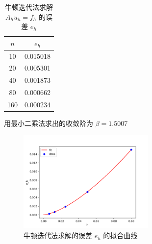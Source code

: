 \documentclass[a4paper,12pt]{ctexart}
\begin{document}
\begin{table}[ht!]
\centering
\caption{牛顿迭代法求解 $A_h u_h = f_h$ 的误差 $e_h$}
\begin{tabular}{|c|c|}
\hline
$n$     &   $e_h$  \\    \hline
10      &   0.015018    \\
20      &   0.005301    \\
40      &   0.001873    \\
80      &   0.000662    \\
160     &   0.000234    \\
\hline
\end{tabular}
\end{table}



用最小二乘法求出的收敛阶为 $\beta = 1.5007$

\begin{figure}[ht!]
\centering
\caption{牛顿迭代法求解的误差 $e_h$ 的拟合曲线}
\includegraphics[width=0.6\textwidth]{image/Newton.png}
\end{figure}
\end{document}

